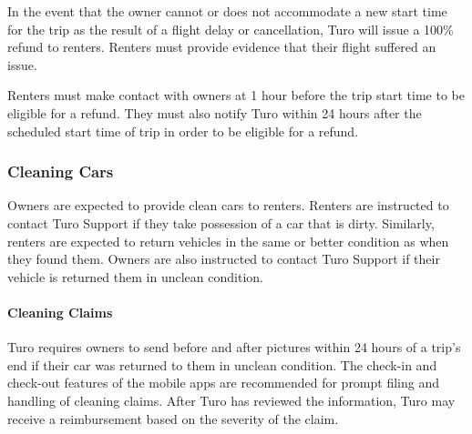 \documentclass[review,12pt]{elsarticle}
\begin{document}
    In the event that the owner cannot or does not accommodate a new start time for the trip as the result of a flight delay or cancellation, Turo will issue a 100\% refund to renters. Renters must provide evidence that their flight suffered an issue.

    Renters must make contact with owners at 1 hour before the trip start time to be eligible for a refund. They must also notify Turo within 24 hours after the scheduled start time of trip in order to be eligible for a refund.

  \subsubsection{Cleaning Cars}
  Owners are expected to provide clean cars to renters. Renters are instructed to contact Turo Support if they take possession of a car that is dirty. Similarly, renters are expected to return vehicles in the same or better condition as when they found them. Owners are also instructed to contact Turo Support if their vehicle is returned them in unclean condition.

    \paragraph{Cleaning Claims}
    Turo requires owners to send before and after pictures within 24 hours of a trip's end if their car was returned to them in unclean condition. The check-in and check-out features of the mobile apps are recommended for prompt filing and handling of cleaning claims. After Turo has reviewed the information, Turo may receive a reimbursement based on the severity of the claim.
\end{document}
